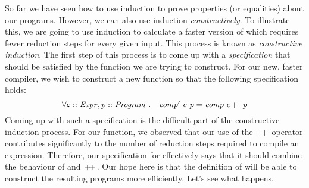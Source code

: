So far we have seen how to use induction to prove properties (or equalities) about our programs. However, we can also use induction \emph{constructively}. To illustrate this, we are going to use induction to calculate a faster version of  which requires fewer reduction steps for every given input. This process is known as \emph{constructive induction}. The first step of this process is to come up with a \emph{specification} that should be satisfied by the function we are trying to construct. For our new, faster compiler, we wish to construct a new function  so that the following specification holds:
\begin{displaymath}
\forall e :: \mathit{Expr}, p :: \mathit{Program} ~.\quad \mathit{comp'}~e~p = \mathit{comp}~e \append p 
\end{displaymath}
Coming up with such a specification is the difficult part of the constructive induction process. For our  function, we observed that our use of the $\append$ operator contributes significantly to the number of reduction steps required to compile an expression. Therefore, our specification for  effectively says that it should combine the behaviour of  and $\append$. Our hope here is that the definition of  will be able to construct the resulting programs more efficiently. Let's see what happens.

